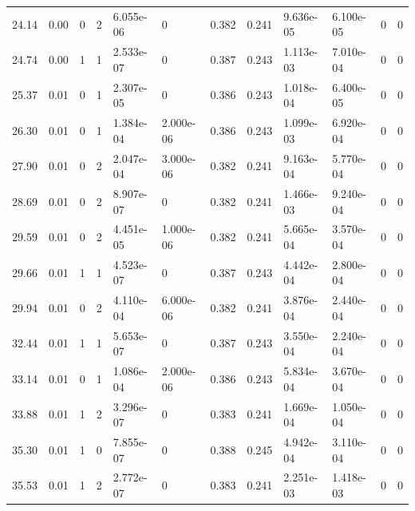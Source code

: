 \documentclass[preview]{standalone}
\begin{document}
{{\begin{tabular}{L{1.2cm}C{1.2cm} C{0.3cm}C{0.5cm} C{1.4cm}C{1.4cm} C{1.4cm}C{1.4cm} C{1.6cm}C{1.6cm} C{1.6cm}C{1.6cm}}
  24.14  &  0.00  & 0     &  2 &  6.055e-06  & 0  &  0.382&   0.241& 9.636e-05 & 6.100e-05   &  0 & 0  \\ 
  24.74  &  0.00  & 1     &  1 &  2.533e-07  & 0  &  0.387&   0.243& 1.113e-03 & 7.010e-04   &  0 & 0  \\ 
  25.37  &  0.01  & 0     &  1 &  2.307e-05  & 0  &  0.386&   0.243& 1.018e-04 & 6.400e-05   &  0 & 0  \\ 
  26.30  &  0.01  & 0     &  1 &  1.384e-04  & 2.000e-06  &  0.386&   0.243& 1.099e-03 & 6.920e-04   &  0 & 0  \\ 
  27.90  &  0.01  & 0     &  2 &  2.047e-04  & 3.000e-06  &  0.382&   0.241& 9.163e-04 & 5.770e-04   &  0 & 0  \\ 
  28.69  &  0.01  & 0     &  2 &  8.907e-07  & 0  &  0.382&   0.241& 1.466e-03 & 9.240e-04   &  0 & 0  \\ 
  29.59  &  0.01  & 0     &  2 &  4.451e-05  & 1.000e-06  &  0.382&   0.241& 5.665e-04 & 3.570e-04   &  0 & 0  \\ 
  29.66  &  0.01  & 1     &  1 &  4.523e-07  & 0  &  0.387&   0.243& 4.442e-04 & 2.800e-04   &  0 & 0  \\ 
  29.94  &  0.01  & 0     &  2 &  4.110e-04  & 6.000e-06  &  0.382&   0.241& 3.876e-04 & 2.440e-04   &  0 & 0  \\ 
  32.44  &  0.01  & 1     &  1 &  5.653e-07  & 0  &  0.387&   0.243& 3.550e-04 & 2.240e-04   &  0 & 0  \\ 
  33.14  &  0.01  & 0     &  1 &  1.086e-04  & 2.000e-06  &  0.386&   0.243& 5.834e-04 & 3.670e-04   &  0 & 0  \\ 
  33.88  &  0.01  & 1     &  2 &  3.296e-07  & 0  &  0.383&   0.241& 1.669e-04 & 1.050e-04   &  0 & 0  \\ 
  35.30  &  0.01  & 1     &  0 &  7.855e-07  & 0  &  0.388&   0.245& 4.942e-04 & 3.110e-04   &  0 & 0  \\ 
  35.53  &  0.01  & 1     &  2 &  2.772e-07  & 0  &  0.383&   0.241& 2.251e-03 & 1.418e-03   &  0 & 0  \\ 
\hline 
\end{tabular} 

}}
\end{document}
